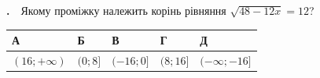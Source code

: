 \documentclass[12pt]{article}
\newlength{\nmtcellw}
\newcommand{\nmtSetCell}{\setlength{\nmtcellw}{\dimexpr(\linewidth-10\tabcolsep-6\arrayrulewidth)/5\relax}}
\newcommand{\answerTable}[5]{%
\par\nopagebreak\vspace{0.15cm}
\noindent\nmtSetCell
\begin{tabular}{|*{5}{>{\centering\arraybackslash}m{\nmtcellw}|}}
\hline
\rule[-0.15cm]{0pt}{0.6cm}\textbf{А} & \rule[-0.15cm]{0pt}{0.6cm}\textbf{Б} & \rule[-0.15cm]{0pt}{0.6cm}\textbf{В} & \rule[-0.15cm]{0pt}{0.6cm}\textbf{Г} & \rule[-0.15cm]{0pt}{0.6cm}\textbf{Д} \\
\hline
\rule[-0.2cm]{0pt}{0.75cm}#1 & \rule[-0.2cm]{0pt}{0.75cm}#2 & \rule[-0.2cm]{0pt}{0.75cm}#3 & \rule[-0.2cm]{0pt}{0.75cm}#4 & \rule[-0.2cm]{0pt}{0.75cm}#5 \\
\hline
\end{tabular}
\par\vspace{0.25cm}
}
\newcommand{\matchingGrid}{%
    \sbox{\nmtgridbox}{\matchingGridRaw}%
    \ifdim\wd\nmtgridbox>\linewidth \resizebox{\linewidth}{!}{\usebox{\nmtgridbox}}\else\usebox{\nmtgridbox}\fi}
\newcommand{\matchingGridRaw}{%
    \begingroup
    \renewcommand{\arraystretch}{1.15}
    \setlength{\tabcolsep}{4pt}
    \footnotesize
    \begin{tabular}{r|c|c|c|c|c|}
         \multicolumn{1}{c}{} & \multicolumn{1}{c}{\textbf{А}} & \multicolumn{1}{c}{\textbf{Б}} & \multicolumn{1}{c}{\textbf{В}} & \multicolumn{1}{c}{\textbf{Г}} & \multicolumn{1}{c}{\textbf{Д}} \\ \cline{2-6}
         \textbf{1} & \phantom{X} & \phantom{X} & \phantom{X} & \phantom{X} & \phantom{X} \\ \cline{2-6}
         \textbf{2} & & & & & \\ \cline{2-6}
         \textbf{3} & & & & & \\ \cline{2-6}
    \end{tabular}
    \endgroup
}
\newcounter{zad}
\newcommand{\zadtask}[1]{\stepcounter{zad}\noindent\textbf{\thezad.}\ \ #1\par\nopagebreak\vspace{0.2cm}}
\newcounter{ans}
\newcommand{\nmtnobreak}{\ifvmode\penalty10000 \fi}
\begin{document}
\begingroup
\providecommand{\trigStyle}[1]{#1}
\providecommand{\answerTableSmall}[5]{%
\begingroup\setlength{\tabcolsep}{2pt}\small\nmtSetCell
\begin{tabular}{|*{5}{>{\centering\arraybackslash}m{\nmtcellw}|}}
\hline
\rule[-0.2cm]{0pt}{0.6cm}\textbf{А} & \textbf{Б} & \textbf{В} & \textbf{Г} & \textbf{Д} \\
\hline
\rule[-0.4cm]{0pt}{0.9cm}#1 & \rule[-0.4cm]{0pt}{0.9cm}#2 & \rule[-0.4cm]{0pt}{0.9cm}#3 & \rule[-0.4cm]{0pt}{0.9cm}#4 & \rule[-0.4cm]{0pt}{0.9cm}#5 \\
\hline
\end{tabular}\endgroup}
\providecommand{\matchingLayout}[3]{%
    \noindent
    \begin{minipage}[t]{0.36\textwidth}\vspace{0pt}\raggedright
        #1
    \end{minipage}%
    \hfill
    \begin{minipage}[t]{0.43\textwidth}\vspace{0pt}\raggedright
        #2
    \end{minipage}%
    \hfill
    \begin{minipage}[t]{0.19\textwidth}
        \vspace{0pt}
        \begin{flushright}
        #3
        \end{flushright}
    \end{minipage}}
\providecommand{\matchingLayoutBottom}[2]{%
    \noindent
    \begin{minipage}[t]{0.48\textwidth}\vspace{0pt}\raggedright
        #1
    \end{minipage}%
    \hfill
    \begin{minipage}[t]{0.48\textwidth}\vspace{0pt}\raggedright
        #2
    \end{minipage}
    \vspace{0.5cm}
    \noindent
    \matchingGrid}
\providecommand{\answerListVertical}[5]{%
    \par\nopagebreak\vspace{0.2cm}
    \begin{itemize}[itemsep=0.4cm, leftmargin=1.5cm, labelsep=0.5cm]
        \item[\textbf{А}] #1
        \item[\textbf{Б}] #2
        \item[\textbf{В}] #3
        \item[\textbf{Г}] #4
        \item[\textbf{Д}] #5
    \end{itemize}
    \vspace{0.2cm}}
\begin{samepage}
\zadtask{Якому проміжку належить корінь рівняння $\sqrt{48 - 12x} = 12$?}

\nmtnobreak
\answerTable{$(16; +\infty)$}{$(0; 8]$}{$(-16; 0]$}{$(8; 16]$}{$(-\infty; -16]$}
\par{}
\end{samepage}
\endgroup
\end{document}
